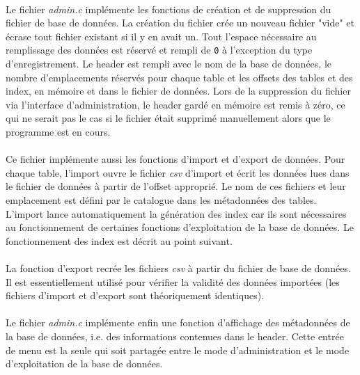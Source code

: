 \documentclass{article}
\begin{document}
    \paragraph{}
    Le fichier \emph{admin.c} implémente les fonctions de création et de suppression du fichier de base de données. La création du fichier crée un nouveau fichier "vide" et écrase tout fichier existant si il y en avait un. Tout l'espace nécessaire au remplissage des données est réservé et rempli de \texttt{0} à l'exception du type d'enregistrement. Le header est rempli avec le nom de la base de données, le nombre d'emplacements réservés pour chaque table et les offsets des tables et des index, en mémoire et dans le fichier de données. Lors de la suppression du fichier via l'interface d'administration, le header gardé en mémoire est remis à zéro, ce qui ne serait pas le cas si le fichier était supprimé manuellement alors que le programme est en cours.

    \paragraph{}
    Ce fichier implémente aussi les fonctions d'import et d'export de données. Pour chaque table, l'import ouvre le fichier \emph{csv} d'import et écrit les données lues dans le fichier de données à partir de l'offset approprié. Le nom de ces fichiers et leur emplacement est défini par le catalogue dans les métadonnées des tables. L'import lance automatiquement la génération des index car ils sont nécessaires au fonctionnement de certaines fonctions d'exploitation de la base de données. Le fonctionnement des index est décrit au point suivant.

    \paragraph{}
    La fonction d'export recrée les fichiers \emph{csv} à partir du fichier de base de données. Il est essentiellement utilisé pour vérifier la validité des données importées (les fichiers d'import et d'export sont théoriquement identiques).

    \paragraph{}
    Le fichier \emph{admin.c} implémente enfin une fonction d'affichage des métadonnées de la base de données, i.e. des informations contenues dans le header. Cette entrée de menu est la seule qui soit partagée entre le mode d'administration et le mode d'exploitation de la base de données.
\end{document}
